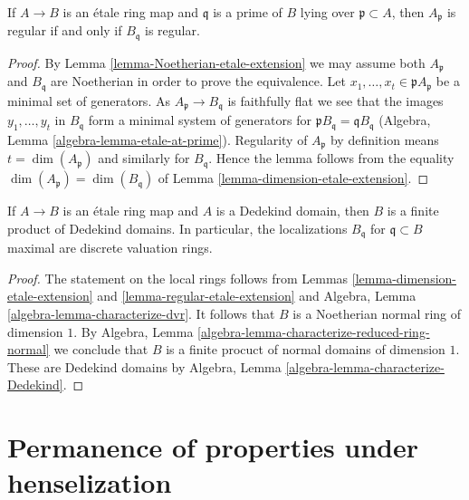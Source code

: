 \begin{lemma}
\label{lemma-regular-etale-extension}
If $A \to B$ is an \'etale ring map and $\mathfrak q$ is a prime of
$B$ lying over $\mathfrak p \subset A$, then
$A_{\mathfrak p}$ is regular if and only if $B_{\mathfrak q}$ is regular.
\end{lemma}

\begin{proof}
By Lemma \ref{lemma-Noetherian-etale-extension}
we may assume both $A_\mathfrak p$ and $B_\mathfrak q$
are Noetherian in order to prove the equivalence.
Let $x_1, \ldots, x_t \in \mathfrak pA_\mathfrak p$
be a minimal set of generators. As $A_\mathfrak p \to B_\mathfrak q$
is faithfully flat we see that the images $y_1, \ldots, y_t$
in $B_\mathfrak q$ form a minimal system of generators for
$\mathfrak pB_\mathfrak q = \mathfrak q B_\mathfrak q$
(Algebra, Lemma \ref{algebra-lemma-etale-at-prime}).
Regularity of $A_\mathfrak p$ by definition means $t = \dim(A_\mathfrak p)$
and similarly for $B_\mathfrak q$. Hence the lemma follows from
the equality $\dim(A_\mathfrak p) = \dim(B_\mathfrak q)$
of Lemma \ref{lemma-dimension-etale-extension}.
\end{proof}

\begin{lemma}
\label{lemma-Dedekind-etale-extension}
If $A \to B$ is an \'etale ring map and $A$ is a Dedekind domain, then
$B$ is a finite product of Dedekind domains. In particular, the
localizations $B_\mathfrak q$ for $\mathfrak q \subset B$ maximal
are discrete valuation rings.
\end{lemma}

\begin{proof}
The statement on the local rings follows from
Lemmas \ref{lemma-dimension-etale-extension} and
\ref{lemma-regular-etale-extension}
and Algebra, Lemma \ref{algebra-lemma-characterize-dvr}.
It follows that $B$ is a Noetherian normal ring of dimension $1$.
By Algebra, Lemma \ref{algebra-lemma-characterize-reduced-ring-normal}
we conclude that $B$ is a finite procuct of normal domains of
dimension $1$. These are Dedekind domains by
Algebra, Lemma \ref{algebra-lemma-characterize-Dedekind}.
\end{proof}



\section{Permanence of properties under henselization}
\label{section-permanence-henselization}

